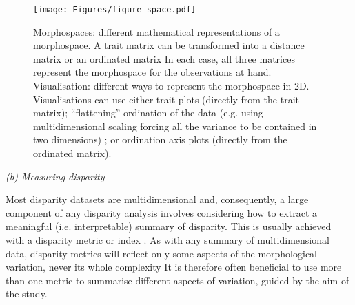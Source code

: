 \documentclass[12pt,letterpaper]{article}
\renewcommand{\subsection}[1]{%
\bigskip
\begin{center}
\begin{large}
\normalfont\itshape #1
\end{large}
\end{center}}
\begin{document}
\begin{figure}[!htbp]
\centering
   \texttt{[image: Figures/figure\_space.pdf]}
\caption{
    Morphospaces: different mathematical representations of a morphospace.
    A trait matrix can be transformed into a distance matrix \citep[e.g in][]{Close2015-qi} or an ordinated matrix \citep[e.g. in][]{Brusatte2008-vx}
    In each case, all three matrices represent the morphospace for the observations at hand.
    Visualisation: different ways to represent the morphospace in 2D.
    Visualisations can use either trait plots (directly from the trait matrix); ``flattening'' ordination of the data (e.g. using multidimensional scaling forcing all the variance to be contained in two dimensions)
    ; or ordination axis plots (directly from the ordinated matrix).
}
\label{Fig:morphospace}
\end{figure}


\subsection{(b) Measuring disparity}

Most disparity datasets are multidimensional and, consequently, a large component of any disparity analysis involves considering how to extract a meaningful (i.e. interpretable) summary of disparity.
This is usually achieved with a disparity metric or index \citep{Hopkins2017-cf}.
As with any summary of multidimensional data, disparity metrics will reflect only some aspects of the morphological variation, never its whole complexity %
It is therefore often beneficial to use more than one metric to summarise different aspects of variation, guided by the aim of the study.
\end{document}
